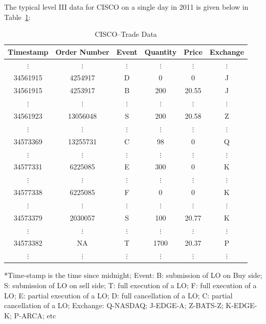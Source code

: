 The typical level III data for CISCO on a single day in 2011 is given below in Table~\ref{tab:CISCO}:
\begin{table}[!ht]
   \centering
   \caption{CISCO--Trade Data\label{tab:CISCO}}
   \begin{tabular}{cccccc} 
	Timestamp & Order Number & Event & Quantity & Price & Exchange \\ \hline
	$\vdots$ & $\vdots$ & $\vdots$ & $\vdots$ & $\vdots$ & $\vdots$ \\
	34561915 & 4254917 & D & 0 & 0 & J \\
	34561915 & 4253917 & B & 200 & 20.55 & J \\
	$\vdots$ & $\vdots$ & $\vdots$ & $\vdots$ & $\vdots$ & $\vdots$ \\
	34561923 & 13056048 & S & 200 & 20.58 & Z \\
	$\vdots$ & $\vdots$ & $\vdots$ & $\vdots$ & $\vdots$ & $\vdots$ \\
	34573369 & 13255731 & C & 98 & 0 & Q \\
	$\vdots$ & $\vdots$ & $\vdots$ & $\vdots$ & $\vdots$ & $\vdots$ \\
	34577331 & 6225085 & E & 300 & 0 & K \\
	$\vdots$ & $\vdots$ & $\vdots$ & $\vdots$ & $\vdots$ & $\vdots$ \\
	34577338 & 6225085 & F & 0 & 0 & K \\
	$\vdots$ & $\vdots$ & $\vdots$ & $\vdots$ & $\vdots$ & $\vdots$ \\
	34573379 & 2030057 & S & 100 & 20.77 & K \\
	$\vdots$ & $\vdots$ & $\vdots$ & $\vdots$ & $\vdots$ & $\vdots$ \\
	34573382 & NA & T & 1700 & 20.37 & P \\
	$\vdots$ & $\vdots$ & $\vdots$ & $\vdots$ & $\vdots$ & $\vdots$ 
   \end{tabular}
\begin{minipage}[t]{1\textwidth}
\small{*Time-stamp is the time since midnight; Event: B: submission of LO on Buy side; S: submission of LO on sell side; T: full execution of a LO; F: full execution of a LO; E: partial execution of a LO; D: full cancellation of a LO; C: partial cancellation of a LO; Exchange: Q-NASDAQ; J-EDGE-A; Z-BATS-Z; K-EDGE-K; P-ARCA; etc}
\end{minipage}
\end{table}


